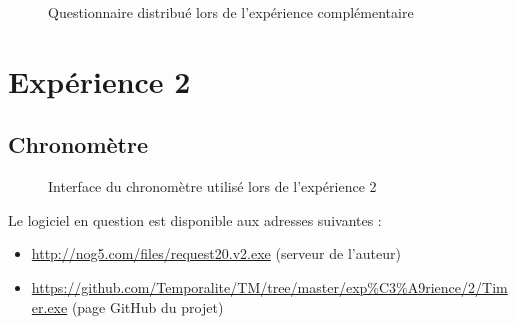 \documentclass[12pt,fleqn,oneside,openany]{book} %
\begin{document}
\clearpage
\begin{figure}[htp] 
	\caption{Questionnaire distribué lors de l'expérience complémentaire}
\end{figure}

\clearpage
\section*{Expérience 2}
\subsection*{Chronomètre} \label{sec:chrono}
\begin{figure}[htp] 
	\caption{Interface du chronomètre utilisé lors de l'expérience 2}
\end{figure}
Le logiciel en question est disponible aux adresses suivantes :
\begin{itemize}
\item \url{http://nog5.com/files/request20.v2.exe} (serveur de l'auteur)
\item \url{https://github.com/Temporalite/TM/tree/master/exp%C3%A9rience/2/Timer.exe} (page GitHub du projet)
\end{itemize}
\end{document}
